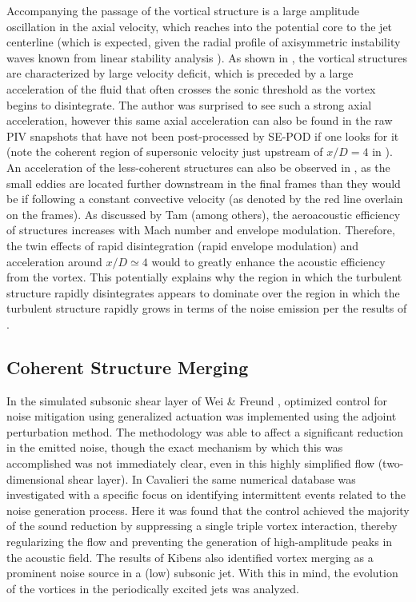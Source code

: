 Accompanying the passage of the vortical structure is a large amplitude oscillation in the axial velocity, which reaches into the potential core to the jet centerline (which is expected, given the radial profile of axisymmetric instability waves known from linear stability analysis \citep{Michalke1965}).
As shown in , the vortical structures are characterized by large velocity deficit, which is preceded by a large acceleration of the fluid that often crosses the sonic threshold as the vortex begins to disintegrate.
The author was surprised to see such a strong axial acceleration, however this same axial acceleration can also be found in the raw PIV snapshots that have not been post-processed by SE-POD if one looks for it (note the coherent region of supersonic velocity just upstream of $x/D = 4$ in ).
An acceleration of the less-coherent structures can also be observed in , as the small eddies are located further downstream in the final frames than they would be if following a constant convective velocity (as denoted by the red line overlain on the frames).
As discussed by Tam \citep{Tam1996} (among others), the aeroacoustic efficiency of structures increases with Mach number and envelope modulation.
Therefore, the twin effects of rapid disintegration (\ie rapid envelope modulation) and acceleration around $x/D \simeq 4$ would to greatly enhance the acoustic efficiency from the vortex.
This potentially explains why the region in which the turbulent structure rapidly disintegrates appears to dominate over the region in which the turbulent structure rapidly grows in terms of the noise emission per the results of .

\subsection{Coherent Structure Merging}
In the simulated subsonic shear layer of Wei \& Freund \citep{Wei2006}, optimized control for noise mitigation using generalized actuation was implemented using the adjoint perturbation method.
The methodology was able to affect a significant reduction in the emitted noise, though the exact mechanism by which this was accomplished was not immediately clear, even in this highly simplified flow (two-dimensional shear layer).
In Cavalieri \etal \cite{Cavalieri2010b} the same numerical database was investigated with a specific focus on identifying intermittent events related to the noise generation process.
Here it was found that the control achieved the majority of the sound reduction by suppressing a single triple vortex interaction, thereby regularizing the flow and preventing the generation of high-amplitude peaks in the acoustic field.
The results of Kibens \citep{Kibens1980} also identified vortex merging as a prominent noise source in a (low) subsonic jet.
With this in mind, the evolution of the vortices in the periodically excited jets was analyzed.

